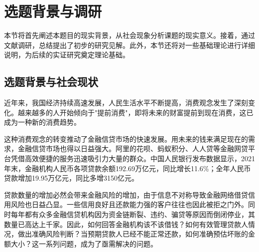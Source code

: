 \documentclass[13.5pt,hyperref,a4paper,UTF8]{ctexart}
\begin{document}

%
%
%
%
%
%

\section{选题背景与调研}
\indent  本节将首先阐述本题目的现实背景，从社会现象分析课题的现实意义。接着，通过文献调研，总结提出了初步的研究见解。此外，本节还将对一些基础理论进行详细说明，为后续的实证研究奠定理论基础。
\subsection{选题背景与社会现状}
\indent 近年来，我国经济持续高速发展，人民生活水平不断提高，消费观念发生了深刻变化。越来越多的人开始倾向于"提前消费"，即将未来的财富提前到现在消费，这已成为一种新的消费趋势。

这种消费观念的转变推动了金融信贷市场的快速发展。用未来的钱来满足现在的需求，金融信贷市场也得以日益强大。阿里的花呗、蚂蚁积分、人人贷等金融网贷平台凭借高效便捷的服务迅速吸引力大量的群众。中国人民银行发布数据显示，2021年末，金融机构人民币各项贷款余额192.69万亿元，同比增长11.6\%；全年人民币贷款增加19.95万亿元，同比多增3150亿元。\cite{loanStatisticCH1}

贷款数量的增加必然会带来金融风险的增加，由于信息不对称导致金融网络借贷信用风险也日益凸显。一些信用良好且还款能力强的客户往往也因此被拒之门外。同时每年都有众多金融信贷机构因为资金链断裂、违约、骗贷等原因而倒闭停业，其数量已高达上千家。因此，如何回答金融机构该不该借钱？如何有效管理贷款人情况，做出准确风险判断？当预期贷款人已经不能正常还款，如何准确预估坏账的金额大小？这一系列问题，成为了亟需解决的问题。
\end{document}
